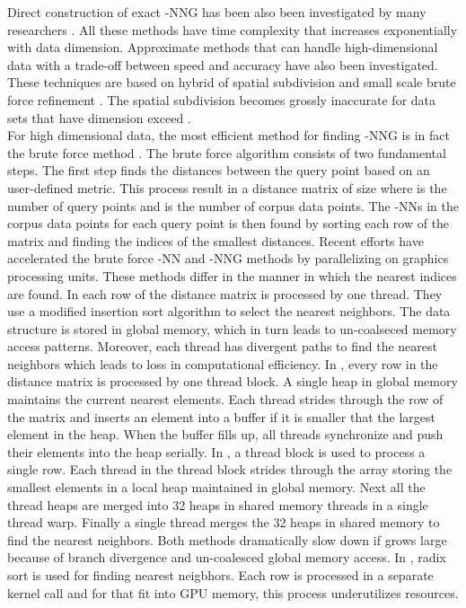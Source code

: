 \documentclass[10pt]{article}
\begin{document}
Direct construction of exact -NNG has been also been investigated by many researchers \cite{Bentley:1980, Clarkson:1983,Vaidya:1989,ParedesCFN:2006,Chan:1998,ConnorK:2010}. All these methods have time complexity that increases exponentially with data dimension.  Approximate methods that can handle high-dimensional data with a trade-off between speed and accuracy have also been investigated. These techniques are based on hybrid of spatial subdivision and small scale brute force refinement  \cite{ChenFS:2009,Wang:2012, DongCL:2011}.  The spatial subdivision becomes grossly inaccurate for data sets that have dimension exceed .\\

For high dimensional data, the most efficient method for finding -NNG is in fact the brute force method \cite{Indyk:2004}. The brute force algorithm consists of two fundamental steps. The first step finds the distances between the query point based on an user-defined metric. This process result in a distance matrix of size  where  is the number of query points and  is the number of corpus data points. The -NNs in the corpus data points for each query point is then found by sorting each row of the matrix and finding the  indices of the  smallest distances. Recent efforts have accelerated the brute force -NN and -NNG methods by parallelizing on graphics processing units. These methods differ in the manner in which the  nearest indices are found. In \cite{Garcia2010, Arefin2012} each row of the distance matrix is processed by one thread. They use a modified insertion sort algorithm to select the  nearest neighbors. The data structure is stored in global memory, which in turn leads to un-coalseced memory access patterns. Moreover, each thread has divergent paths to find the  nearest neighbors which leads to loss in computational efficiency. In \cite{Barrientos2011}, every row in the distance matrix is processed by one thread block. A single heap in global memory maintains the current  nearest elements. Each thread strides through the row of the matrix and inserts an element into a buffer if it is smaller that the largest element in the heap. When the buffer fills up, all threads synchronize and push their elements into the heap serially.   In \cite{Kato2009}, a thread block is used to process a single row. Each thread in the thread block strides through the array storing the  smallest elements in a local heap maintained in global memory. Next all the thread heaps are merged into 32 heaps in shared memory threads in a single thread warp. Finally a single thread merges the 32 heaps in shared memory to find the  nearest neighbors. Both methods dramatically slow down if  grows large because of branch divergence and un-coalesced global memory access. In \cite{Kuang:2009}, radix sort is used for finding  nearest neigbhors. Each row is processed in a separate kernel call and for  that fit into GPU memory, this process underutilizes resources.\\
\end{document}

